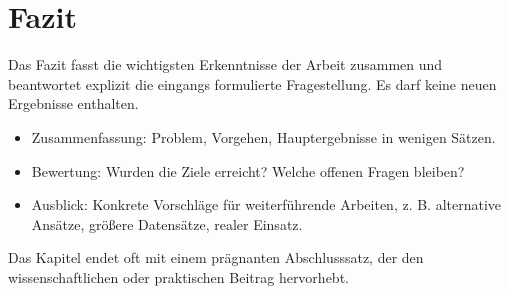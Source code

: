 \chapter{Fazit}\label{ch:fazit}

Das Fazit fasst die wichtigsten Erkenntnisse der Arbeit zusammen und beantwortet explizit die eingangs formulierte Fragestellung.
Es darf keine neuen Ergebnisse enthalten.

\begin{itemize}
\item Zusammenfassung: Problem, Vorgehen, Hauptergebnisse in wenigen Sätzen.
\item Bewertung: Wurden die Ziele erreicht? Welche offenen Fragen bleiben?
\item Ausblick: Konkrete Vorschläge für weiterführende Arbeiten, z. B. alternative Ansätze, größere Datensätze, realer Einsatz.
\end{itemize}

Das Kapitel endet oft mit einem prägnanten Abschlusssatz, der den wissenschaftlichen oder praktischen Beitrag hervorhebt.

